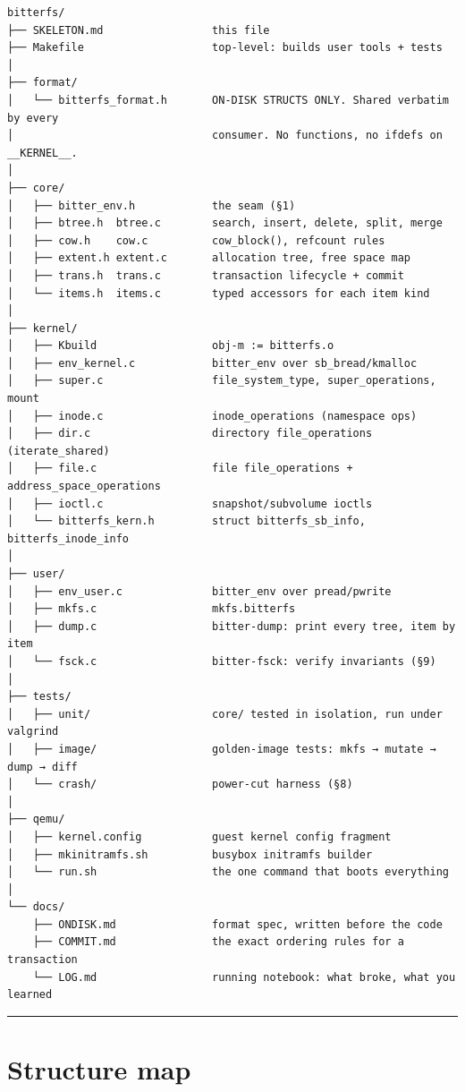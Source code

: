 \begin{verbatim}
bitterfs/
├── SKELETON.md                 this file
├── Makefile                    top-level: builds user tools + tests
│
├── format/
│   └── bitterfs_format.h       ON-DISK STRUCTS ONLY. Shared verbatim by every
│                               consumer. No functions, no ifdefs on __KERNEL__.
│
├── core/
│   ├── bitter_env.h            the seam (§1)
│   ├── btree.h  btree.c        search, insert, delete, split, merge
│   ├── cow.h    cow.c          cow_block(), refcount rules
│   ├── extent.h extent.c       allocation tree, free space map
│   ├── trans.h  trans.c        transaction lifecycle + commit
│   └── items.h  items.c        typed accessors for each item kind
│
├── kernel/
│   ├── Kbuild                  obj-m := bitterfs.o
│   ├── env_kernel.c            bitter_env over sb_bread/kmalloc
│   ├── super.c                 file_system_type, super_operations, mount
│   ├── inode.c                 inode_operations (namespace ops)
│   ├── dir.c                   directory file_operations (iterate_shared)
│   ├── file.c                  file file_operations + address_space_operations
│   ├── ioctl.c                 snapshot/subvolume ioctls
│   └── bitterfs_kern.h         struct bitterfs_sb_info, bitterfs_inode_info
│
├── user/
│   ├── env_user.c              bitter_env over pread/pwrite
│   ├── mkfs.c                  mkfs.bitterfs
│   ├── dump.c                  bitter-dump: print every tree, item by item
│   └── fsck.c                  bitter-fsck: verify invariants (§9)
│
├── tests/
│   ├── unit/                   core/ tested in isolation, run under valgrind
│   ├── image/                  golden-image tests: mkfs → mutate → dump → diff
│   └── crash/                  power-cut harness (§8)
│
├── qemu/
│   ├── kernel.config           guest kernel config fragment
│   ├── mkinitramfs.sh          busybox initramfs builder
│   └── run.sh                  the one command that boots everything
│
└── docs/
    ├── ONDISK.md               format spec, written before the code
    ├── COMMIT.md               the exact ordering rules for a transaction
    └── LOG.md                  running notebook: what broke, what you learned
\end{verbatim}

\begin{center}\rule{0.5\linewidth}{0.5pt}\end{center}

\hypertarget{structure-map}{%
\section{Structure map}\label{structure-map}}

